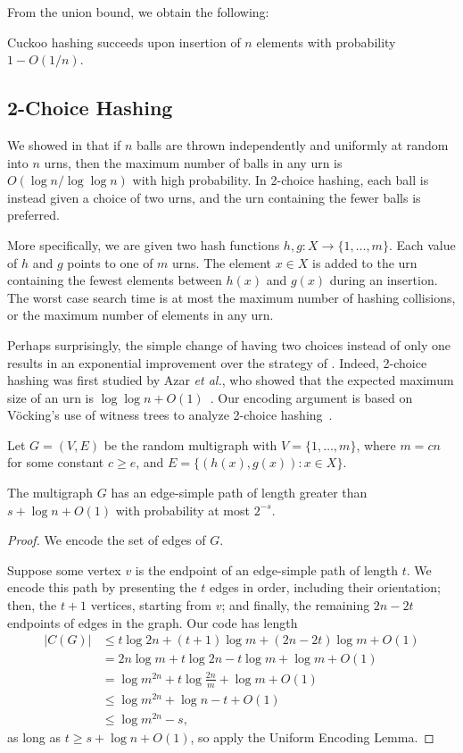 \documentclass{patmorin}
\begin{document}
From the union bound, we obtain the following:
\begin{cor}
  Cuckoo hashing succeeds upon insertion of $n$ elements with
  probability $1 - O(1/n)$.
\end{cor}

\subsection{2-Choice Hashing}

We showed in  that if $n$ balls are thrown independently
and uniformly at random into $n$ urns, then the maximum number of
balls in any urn is $O(\log n/\log \log n)$ with high probability. In
2-choice hashing, each ball is instead given a choice of two urns, and
the urn containing the fewer balls is preferred.

More specifically, we are given two hash functions
$h, g : X \to \{1, \ldots, m\}$. Each value of $h$ and $g$ points to
one of $m$ urns. The element $x \in X$ is added to the urn containing
the fewest elements between $h(x)$ and $g(x)$ during an insertion. The
worst case search time is at most the maximum number of hashing
collisions, or the maximum number of elements in any urn.

Perhaps surprisingly, the simple change of having two choices instead
of only one results in an exponential improvement over the strategy of
. Indeed, 2-choice hashing was first studied by Azar
\emph{et al.}, who showed that the expected maximum size of an urn is
$\log \log n + O(1)$~\cite{azar:multiplechoice}. Our encoding argument
is based on V\"{o}cking's use of witness trees to analyze 2-choice
hashing~\cite{vocking:witness}.

Let $G = (V, E)$ be the random multigraph with $V = \{1, \ldots, m\}$,
where $m = cn$ for some constant $c \geq e$, and
$E = \{(h(x), g(x)) : x \in X\}$.

\begin{lem}
  The multigraph $G$ has an edge-simple path of length greater than
  $s + \log n + O(1)$ with probability at most $2^{-s}$.
\end{lem}
\begin{proof}
  We encode the set of edges of $G$.

  Suppose some vertex $v$ is the endpoint of an edge-simple path of
  length $t$. We encode this path by presenting the $t$ edges in
  order, including their orientation; then, the $t + 1$ vertices,
  starting from $v$; and finally, the remaining $2n - 2t$ endpoints of
  edges in the graph. Our code has length
  \begin{align*}
    |C(G)| &\leq t\log 2n + (t + 1)\log m + (2n - 2t)\log m + O(1) \\
           &= 2n \log m + t \log 2n - t \log m + \log m + O(1) \\
           &= \log m^{2n} + t \log \frac{2n}{m} + \log m + O(1) \\
           &\leq \log m^{2n} + \log n - t + O(1) \\
           &\leq \log m^{2n} - s,
  \end{align*}
  as long as $t \geq s + \log n + O(1)$, so apply the Uniform Encoding
  Lemma.
\end{proof}
\end{document}
